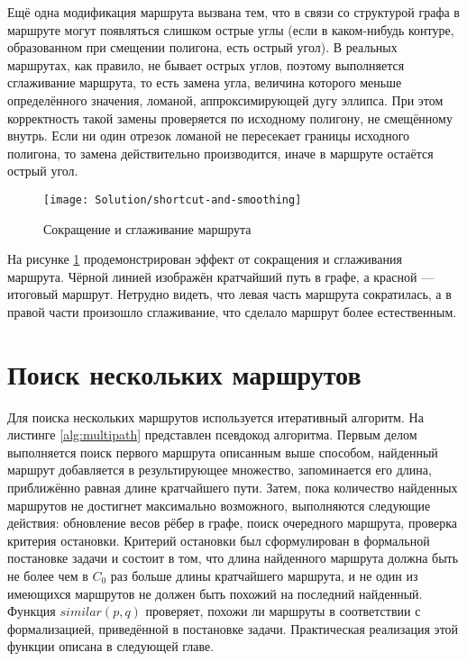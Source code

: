 Ещё одна модификация маршрута вызвана тем, что в связи со структурой
графа в маршруте могут появляться слишком острые углы (если в
каком-нибудь контуре, образованном при смещении полигона, есть острый
угол). В реальных маршрутах, как правило, не бывает острых углов,
поэтому выполняется сглаживание маршрута, то есть замена угла,
величина которого меньше определённого значения, ломаной,
аппроксимирующей дугу эллипса. При этом корректность такой замены
проверяется по исходному полигону, не смещённому внутрь. Если ни один
отрезок ломаной не пересекает границы исходного полигона, то замена
действительно производится, иначе в маршруте остаётся острый угол.

\begin{figure}
    \texttt{[image: Solution/shortcut-and-smoothing]}
    \caption{Сокращение и сглаживание маршрута}
    \label{fig:path-improvements}
\end{figure}

На рисунке \ref{fig:path-improvements} продемонстрирован эффект от
сокращения и сглаживания маршрута. Чёрной линией изображён кратчайший
путь в графе, а красной --- итоговый маршрут. Нетрудно видеть, что
левая часть маршрута сократилась, а в правой части произошло
сглаживание, что сделало маршрут более естественным.

\FloatBarrier

\section{Поиск нескольких маршрутов}

\label{sec:multi-search}

Для поиска нескольких маршрутов используется итеративный алгоритм. На
листинге \ref{alg:multipath} представлен псевдокод алгоритма. Первым
делом выполняется поиск первого маршрута описанным выше способом,
найденный маршрут добавляется в результирующее множество, запоминается
его длина, приближённо равная длине кратчайшего пути. Затем, пока
количество найденных маршрутов не достигнет максимально возможного,
выполняются следующие действия: обновление весов рёбер в графе, поиск
очередного маршрута, проверка критерия остановки. Критерий остановки
был сформулирован в формальной постановке задачи и состоит в том, что
длина найденного маршрута должна быть не более чем в $C_0$ раз больше
длины кратчайшего маршрута, и не один из имеющихся маршрутов не должен
быть похожий на последний найденный. Функция $similar(p, q)$
проверяет, похожи ли маршруты в соответствии с формализацией,
приведённой в постановке задачи. Практическая реализация этой функции
описана в следующей главе.

